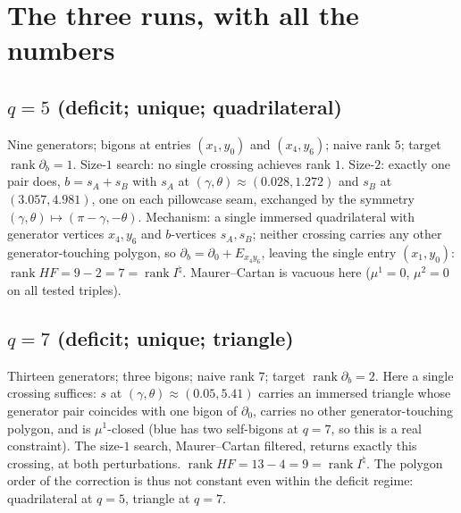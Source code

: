 \documentclass[11pt,reqno]{amsart}
\theoremstyle{plain}
\theoremstyle{definition}
\newcommand{\Inat}{I^{\natural}}
\newcommand{\HF}{\mathit{HF}}
\newcommand{\rk}{\operatorname{rank}}
\newcommand{\bc}{b}
\begin{document}
\section{The three runs, with all the numbers}\label{sec:runs}

\subsection{$q=5$ (deficit; unique; quadrilateral)}\label{ss:q5}
Nine generators; bigons at entries $(x_1,y_0)$ and $(x_4,y_6)$; naive rank $5$; target
$\rk\partial_\bc=1$. Size-$1$ search: no single crossing achieves rank $1$. Size-$2$: exactly
one pair does, $\bc=s_A+s_B$ with $s_A$ at $(\gamma,\theta)\approx(0.028,1.272)$ and $s_B$ at
$(3.057,4.981)$,
one on each pillowcase seam, exchanged by the symmetry
$(\gamma,\theta)\mapsto(\pi-\gamma,-\theta)$. Mechanism: a single immersed quadrilateral with
generator vertices $x_4,y_6$ and $\bc$-vertices $s_A,s_B$; neither crossing carries any other
generator-touching polygon, so $\partial_\bc=\partial_0+E_{x_4y_6}$, leaving the single entry
$(x_1,y_0)$: $\rk\HF=9-2=7=\rk\Inat$. Maurer--Cartan is vacuous here ($\mu^1=0$, $\mu^2=0$ on
all tested triples).

\subsection{$q=7$ (deficit; unique; triangle)}\label{ss:q7}
Thirteen generators; three bigons; naive rank $7$; target $\rk\partial_\bc=2$. Here a single
crossing suffices: $s$ at $(\gamma,\theta)\approx(0.05,5.41)$ carries an immersed triangle whose generator pair
coincides with one bigon of $\partial_0$, carries no other generator-touching polygon, and is
$\mu^1$-closed (blue has two self-bigons at $q=7$, so this is a real constraint). The
size-$1$ search, Maurer--Cartan filtered, returns exactly this crossing, at both
perturbations. $\rk\HF=13-4=9=\rk\Inat$. The polygon order of the correction is thus not
constant even within the deficit regime: quadrilateral at $q=5$, triangle at $q=7$.
\end{document}
